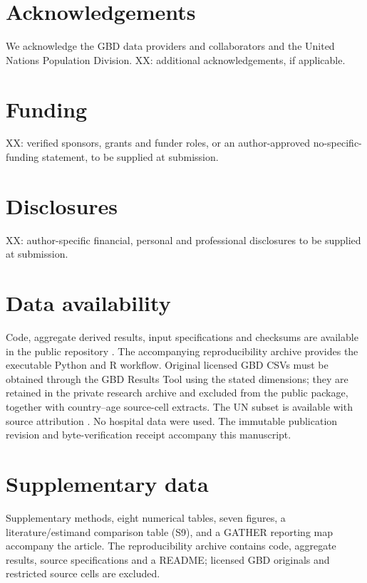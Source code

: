 \documentclass[11pt,a4paper]{article}
\begin{document}
\section*{Acknowledgements}
We acknowledge the GBD data providers and collaborators and the United Nations Population Division. XX: additional acknowledgements, if applicable.

\section*{Funding}
XX: verified sponsors, grants and funder roles, or an author-approved no-specific-funding statement, to be supplied at submission.

\section*{Disclosures}
XX: author-specific financial, personal and professional disclosures to be supplied at submission.

\section*{Data availability}
Code, aggregate derived results, input specifications and checksums are available in the public repository \citep{repository}. The accompanying reproducibility archive provides the executable Python and R workflow. Original licensed GBD CSVs must be obtained through the GBD Results Tool \citep{results} using the stated dimensions; they are retained in the private research archive and excluded from the public package, together with country--age source-cell extracts. The UN subset is available with source attribution \citep{wpp2024}. No hospital data were used. The immutable publication revision and byte-verification receipt accompany this manuscript.

\section*{Supplementary data}
Supplementary methods, eight numerical tables, seven figures, a literature/estimand comparison table (S9), and a GATHER reporting map accompany the article. The reproducibility archive contains code, aggregate results, source specifications and a README; licensed GBD originals and restricted source cells are excluded.
\end{document}
